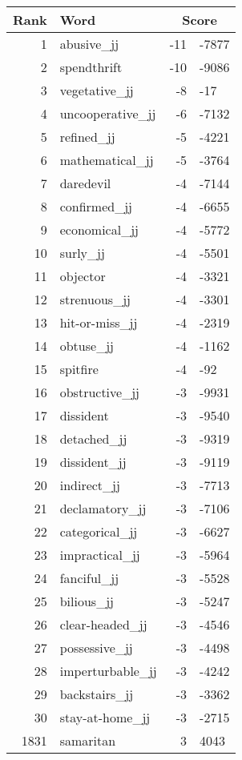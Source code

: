 \begin{longtable}[!htbp]{| rlr@{.}l |}
    \hline
    \textbf{Rank} & \textbf{Word} & \multicolumn{2}{c|}{\textbf{Score}} \\
    \hline
    \endhead
    1 & abusive\_jj & -11 & -7877 \\
    2 & spendthrift & -10 & -9086 \\
    3 & vegetative\_jj & -8 & -17 \\
    4 & uncooperative\_jj & -6 & -7132 \\
    5 & refined\_jj & -5 & -4221 \\
    6 & mathematical\_jj & -5 & -3764 \\
    7 & daredevil & -4 & -7144 \\
    8 & confirmed\_jj & -4 & -6655 \\
    9 & economical\_jj & -4 & -5772 \\
    10 & surly\_jj & -4 & -5501 \\
    11 & objector & -4 & -3321 \\
    12 & strenuous\_jj & -4 & -3301 \\
    13 & hit-or-miss\_jj & -4 & -2319 \\
    14 & obtuse\_jj & -4 & -1162 \\
    15 & spitfire & -4 & -92 \\
    16 & obstructive\_jj & -3 & -9931 \\
    17 & dissident & -3 & -9540 \\
    18 & detached\_jj & -3 & -9319 \\
    19 & dissident\_jj & -3 & -9119 \\
    20 & indirect\_jj & -3 & -7713 \\
    21 & declamatory\_jj & -3 & -7106 \\
    22 & categorical\_jj & -3 & -6627 \\
    23 & impractical\_jj & -3 & -5964 \\
    24 & fanciful\_jj & -3 & -5528 \\
    25 & bilious\_jj & -3 & -5247 \\
    26 & clear-headed\_jj & -3 & -4546 \\
    27 & possessive\_jj & -3 & -4498 \\
    28 & imperturbable\_jj & -3 & -4242 \\
    29 & backstairs\_jj & -3 & -3362 \\
    30 & stay-at-home\_jj & -3 & -2715 \\
    1831 & samaritan & 3 & 4043 \\

\end{longtable}
